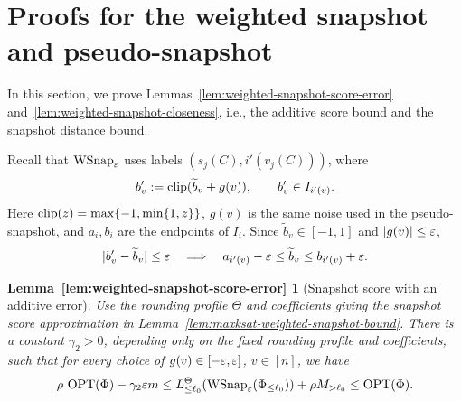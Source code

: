 \section{Proofs for the weighted snapshot and pseudo-snapshot}
\label{app:weighted-snapshot-proofs}

In this section, we prove Lemmas~\ref{lem:weighted-snapshot-score-error} and~\ref{lem:weighted-snapshot-closeness}, i.e., the additive score bound and the snapshot distance bound.

Recall that $\operatorname{WSnap}_{\varepsilon}$ uses labels $(s_j(C),i'(v_j(C)))$, where
\[
  b'_v:=\operatorname{clip}(\widetilde b_v+g(v)),\qquad b'_v\in I_{i'(v)}.
\]
Here $\operatorname{clip}(z)=\max\{-1,\min\{1,z\}\}$, $g(v)$ is the same noise used in the pseudo-snapshot, and $a_i,b_i$ are the endpoints of $I_i$.
Since $\widetilde b_v\in[-1,1]$ and $|g(v)|\le\varepsilon$,
\[
  |b'_v-\widetilde b_v|\le\varepsilon
  \quad\Longrightarrow\quad
  a_{i'(v)}-\varepsilon\le\widetilde b_v\le b_{i'(v)}+\varepsilon.
\]
\theoremstyle{plain}
\newtheorem*{restatedscorelemma}{Lemma~\ref{lem:weighted-snapshot-score-error}}
\newtheorem*{restatedclosenesslemma}{Lemma~\ref{lem:weighted-snapshot-closeness}}
\theoremstyle{definition}

\begin{restatedscorelemma}[Snapshot score with an additive error]
Use the rounding profile $\Theta$ and coefficients giving the snapshot score approximation in Lemma~\ref{lem:maxksat-weighted-snapshot-bound}.
There is a constant $\gamma_2>0$, depending only on the fixed rounding profile and coefficients, such that for every choice of $g(v)\in[-\varepsilon,\varepsilon]$, $v\in[n]$, we have
\[
  \rho\,\operatorname{OPT}(\Phi)-\gamma_2\varepsilon m
  \le L_{\le\ell_0}^\Theta(\operatorname{WSnap}_{\varepsilon}(\Phi_{\le\ell_0}))
     +\rho M_{>\ell_0}
  \le\operatorname{OPT}(\Phi).
\]
\end{restatedscorelemma}

